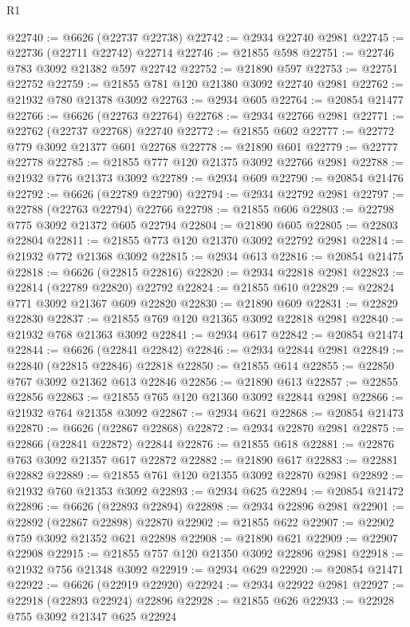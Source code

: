 \begin{lexlean}{R1}
\begin{coremodule}
@22740 := @6626 (@22737 @22738)
@22742 := @2934 @22740 @2981
@22745 := @22736 (@22711 @22742) @22714
@22746 := @21855 @598
@22751 := @22746 @783 @3092 @21382 @597 @22742
@22752 := @21890 @597
@22753 := @22751 @22752
@22759 := @21855 @781 @120 @21380 @3092 @22740 @2981
@22762 := @21932 @780 @21378 @3092
@22763 := @2934 @605
@22764 := @20854 @21477
@22766 := @6626 (@22763 @22764)
@22768 := @2934 @22766 @2981
@22771 := @22762 (@22737 @22768) @22740
@22772 := @21855 @602
@22777 := @22772 @779 @3092 @21377 @601 @22768
@22778 := @21890 @601
@22779 := @22777 @22778
@22785 := @21855 @777 @120 @21375 @3092 @22766 @2981
@22788 := @21932 @776 @21373 @3092
@22789 := @2934 @609
@22790 := @20854 @21476
@22792 := @6626 (@22789 @22790)
@22794 := @2934 @22792 @2981
@22797 := @22788 (@22763 @22794) @22766
@22798 := @21855 @606
@22803 := @22798 @775 @3092 @21372 @605 @22794
@22804 := @21890 @605
@22805 := @22803 @22804
@22811 := @21855 @773 @120 @21370 @3092 @22792 @2981
@22814 := @21932 @772 @21368 @3092
@22815 := @2934 @613
@22816 := @20854 @21475
@22818 := @6626 (@22815 @22816)
@22820 := @2934 @22818 @2981
@22823 := @22814 (@22789 @22820) @22792
@22824 := @21855 @610
@22829 := @22824 @771 @3092 @21367 @609 @22820
@22830 := @21890 @609
@22831 := @22829 @22830
@22837 := @21855 @769 @120 @21365 @3092 @22818 @2981
@22840 := @21932 @768 @21363 @3092
@22841 := @2934 @617
@22842 := @20854 @21474
@22844 := @6626 (@22841 @22842)
@22846 := @2934 @22844 @2981
@22849 := @22840 (@22815 @22846) @22818
@22850 := @21855 @614
@22855 := @22850 @767 @3092 @21362 @613 @22846
@22856 := @21890 @613
@22857 := @22855 @22856
@22863 := @21855 @765 @120 @21360 @3092 @22844 @2981
@22866 := @21932 @764 @21358 @3092
@22867 := @2934 @621
@22868 := @20854 @21473
@22870 := @6626 (@22867 @22868)
@22872 := @2934 @22870 @2981
@22875 := @22866 (@22841 @22872) @22844
@22876 := @21855 @618
@22881 := @22876 @763 @3092 @21357 @617 @22872
@22882 := @21890 @617
@22883 := @22881 @22882
@22889 := @21855 @761 @120 @21355 @3092 @22870 @2981
@22892 := @21932 @760 @21353 @3092
@22893 := @2934 @625
@22894 := @20854 @21472
@22896 := @6626 (@22893 @22894)
@22898 := @2934 @22896 @2981
@22901 := @22892 (@22867 @22898) @22870
@22902 := @21855 @622
@22907 := @22902 @759 @3092 @21352 @621 @22898
@22908 := @21890 @621
@22909 := @22907 @22908
@22915 := @21855 @757 @120 @21350 @3092 @22896 @2981
@22918 := @21932 @756 @21348 @3092
@22919 := @2934 @629
@22920 := @20854 @21471
@22922 := @6626 (@22919 @22920)
@22924 := @2934 @22922 @2981
@22927 := @22918 (@22893 @22924) @22896
@22928 := @21855 @626
@22933 := @22928 @755 @3092 @21347 @625 @22924

\end{coremodule}
\end{lexlean}
